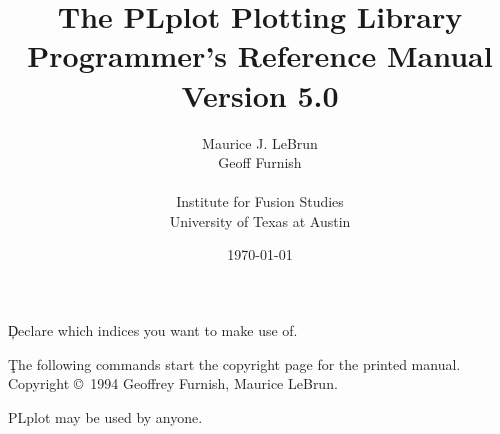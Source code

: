 %
%
%
%
%
%
%
%
%
%
%

\pagestyle{headings}



\c Declare which indices you want to make use of.

\title{ The PLplot Plotting Library \\ 
        Programmer's Reference Manual \\
        Version 5.0}
\author{
        Maurice J. LeBrun\\
        Geoff Furnish\\
\\
        Institute for Fusion Studies\\
        University of Texas at Austin\\
        }

\date{\today}
\maketitle

\c The following commands start the copyright page for the printed manual.
\clearpage
\vspace{0pt plus 1filll}
Copyright \copyright\ 1994 Geoffrey Furnish, Maurice LeBrun.

PLplot may be used by anyone.

